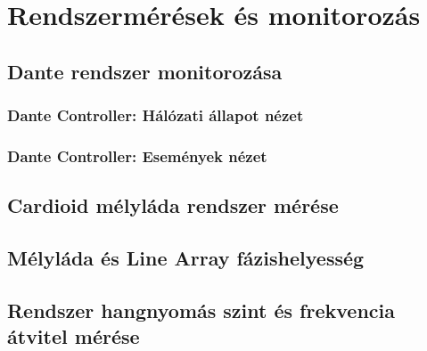 \section{Rendszermérések és monitorozás}
\subsection{Dante rendszer monitorozása}
\subsubsection{Dante Controller: Hálózati állapot nézet}
\subsubsection{Dante Controller: Események nézet}
\subsection{Cardioid mélyláda rendszer mérése}
\subsection{Mélyláda és Line Array fázishelyesség}
\subsection{Rendszer hangnyomás szint és frekvencia átvitel mérése}
